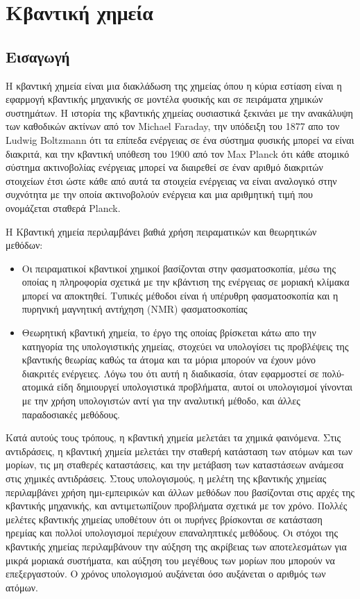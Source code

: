 \section{Κβαντική χημεία}
\subsection{Εισαγωγή}
Η κβαντική χημεία είναι μια διακλάδωση της χημείας όπου η κύρια εστίαση είναι η εφαρμογή κβαντικής μηχανικής σε μοντέλα φυσικής και σε πειράματα  χημικών συστημάτων.
Η ιστορία της κβαντικής χημείας ουσιαστικά ξεκινάει με την ανακάλυψη των καθοδικών ακτίνων από τον Michael Faraday, την υπόδειξη του 1877 απο τον Ludwig Boltzmann ότι τα επίπεδα ενέργειας σε ένα σύστημα φυσικής μπορεί να είναι διακριτά, και την κβαντική υπόθεση του 1900 από τον Max Planck ότι κάθε ατομικό σύστημα ακτινοβολίας ενέργειας μπορεί να διαιρεθεί σε έναν αριθμό διακριτών στοιχείων έτσι ώστε κάθε από αυτά τα στοιχεία ενέργειας να είναι αναλογικό στην συχνότητα με την οποία ακτινοβολούν ενέργεια και μια αριθμητική τιμή που ονομάζεται σταθερά Planck.\cite{quantumchemistry-1}

Η Κβαντική χημεία περιλαμβάνει βαθιά χρήση πειραματικών και θεωρητικών μεθόδων:
\begin{itemize}
\item Οι πειραματικοί κβαντικοί χημικοί βασίζονται στην φασματοσκοπία, μέσω της οποίας η πληροφορία σχετικά με την κβάντιση της ενέργειας σε μοριακή κλίμακα μπορεί να αποκτηθεί. Τυπικές μέθοδοι είναι ή υπέρυθρη φασματοσκοπία και η πυρηνική μαγνητική αντήχηση (NMR) φασματοσκοπίας
\item Θεωρητική κβαντική χημεία, το έργο της οποίας βρίσκεται κάτω απο την κατηγορία της υπολογιστικής χημείας, στοχεύει να υπολογίσει τις προβλέψεις της κβαντικής θεωρίας καθώς τα άτομα και τα μόρια μπορούν να έχουν μόνο διακριτές ενέργειες. Λόγω του ότι αυτή η διαδικασία, όταν εφαρμοστεί σε πολύ-ατομικά είδη δημιουργεί υπολογιστικά προβλήματα, αυτοί οι υπολογισμοί γίνονται με την χρήση υπολογιστών αντί για την αναλυτική μέθοδο, και άλλες παραδοσιακές μεθόδους.\cite{quantumchemistry-3}
\end{itemize}
Κατά αυτούς τους τρόπους, η κβαντική χημεία μελετάει τα χημικά φαινόμενα. Στις αντιδράσεις, η κβαντική χημεία μελετάει την σταθερή κατάσταση των ατόμων και των μορίων, τις μη σταθερές καταστάσεις, και την μετάβαση των καταστάσεων ανάμεσα στις χημικές αντιδράσεις. Στους υπολογισμούς, η μελέτη της κβαντικής χημείας περιλαμβάνει χρήση ημι-εμπειρικών και άλλων μεθόδων που βασίζονται στις αρχές της κβαντικής μηχανικής, και αντιμετωπίζουν προβλήματα σχετικά με τον χρόνο. Πολλές μελέτες κβαντικής χημείας υποθέτουν ότι οι πυρήνες βρίσκονται σε κατάσταση ηρεμίας και πολλοί υπολογισμοί περιέχουν επαναληπτικές μεθόδους.\cite{quantumchemistry-2} Οι στόχοι της κβαντικής χημείας περιλαμβάνουν την αύξηση της ακρίβειας των αποτελεσμάτων για μικρά μοριακά συστήματα, και αύξηση του μεγέθους των μορίων που μπορούν να επεξεργαστούν. Ο χρόνος υπολογισμού αυξάνεται όσο αυξάνεται ο αριθμός των ατόμων.


